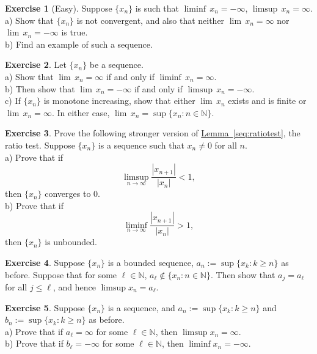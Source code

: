 \documentclass[12pt]{book}
\newcommand{\abs}[1]{\left\lvert {#1} \right\rvert}
\newcommand{\N}{{\mathbb{N}}}
\theoremstyle{plain}
\theoremstyle{remark}
\theoremstyle{definition}
\theoremstyle{exercise}
\newtheorem{exercise}{Exercise}[section]
\theoremstyle{example}
\newcommand{\lemmaref}[1]{\hyperref[#1]{Lemma~\ref*{#1}}}
\begin{document}
\begin{exercise}[Easy] \label{exercise:infseqlimex}
Suppose $\{ x_n \}$ is such that $\liminf \, x_n = -\infty$, $\limsup \, x_n
= \infty$.\\
a) Show that $\{ x_n \}$ is not convergent, and also
that neither $\lim \, x_n = \infty$ nor $\lim \, x_n =
-\infty$
is true.\\
b) Find an example of such a sequence.
\end{exercise}

\begin{exercise} \label{exercise:infseqlimlims}
Let $\{ x_n \}$ be a sequence.\\
a) Show that
$\lim \, x_n = \infty$ if and only if $\liminf \, x_n = \infty$.\\
b) Then show that $\lim \, x_n = - \infty$ if and only if $\limsup \, x_n =
-\infty$.\\
c) If $\{ x_n \}$ is monotone increasing, show that either
$\lim \, x_n$ exists and is finite or $\lim \, x_n = \infty$.  In either
case, $\lim \, x_n = \sup \{ x_n : n \in \N \}$.
\end{exercise}

\begin{exercise} \label{exercise:strongerratiotest2}
Prove the following stronger version of \lemmaref{seq:ratiotest}, the ratio
test.
Suppose $\{ x_n \}$ is a sequence such that $x_n \not= 0$ for all
$n$.
\\
a) Prove that if
\begin{equation*}
\limsup_{n \to \infty} \frac{\abs{x_{n+1}}}{\abs{x_n}} < 1 ,
\end{equation*}
then $\{ x_n \}$ converges to $0$.
\\
b) Prove that if
\begin{equation*}
\liminf_{n \to \infty} \frac{\abs{x_{n+1}}}{\abs{x_n}} > 1 ,
\end{equation*}
then $\{ x_n \}$ is unbounded.
\end{exercise}

\begin{exercise}
Suppose $\{ x_n \}$ is a bounded sequence, $a_n := \sup \{ x_k : k \geq n \}$
as before.  Suppose that for some $\ell \in \N$, $a_\ell \notin \{ x_n : n \in
\N \}$.  Then show that $a_j = a_\ell$ for all $j \leq \ell$, and hence
$\limsup x_n = a_\ell$.
\end{exercise}

\begin{exercise}
Suppose $\{ x_n \}$ is a sequence,
and $a_n := \sup \{ x_k : k \geq n \}$ and
$b_n := \sup \{ x_k : k \geq n \}$ as before.
\\
a) Prove that if $a_\ell = \infty$ for some $\ell \in \N$, then 
$\limsup x_n = \infty$.
\\
b) Prove that if $b_\ell = -\infty$ for some $\ell \in \N$, then 
$\liminf x_n = -\infty$.
\end{exercise}
\end{document}
